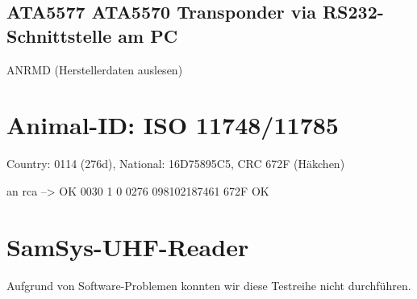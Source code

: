 \documentclass[paper=a4,fontsize=11pt,headsepline,footsepline,parskip=half]{scrartcl}
\begin{document}
\subsection{ATA5577 ATA5570 Transponder via RS232-Schnittstelle am PC}

ANRMD (Herstellerdaten auslesen)

\section{Animal-ID: ISO 11748/11785}

Country: 0114 (276d), National: 16D75895C5, CRC 672F (Häkchen)

an rca --> OK 0030 1 0 0276 098102187461 672F OK

\section{SamSys-UHF-Reader}

Aufgrund von Software-Problemen konnten wir diese Testreihe nicht durchführen.
\end{document}
